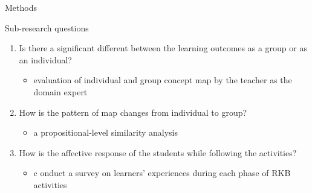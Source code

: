 \begin{frame}{Methods}
    \begin{block}{Sub-research questions}
        \begin{enumerate}
        \item <1-2> Is there a significant different between the learning outcomes as a group
        or as an individual?
        \begin{itemize}
            \item <2> evaluation of individual and group concept map by the teacher 
                  as the domain expert
        \end{itemize}
        
        \item <3-4> How is the pattern of map changes from individual to group?
        \begin{itemize}
            \item <4> a propositional-level similarity analysis
        \end{itemize}
        
        \item <5-6> How is the affective response of the students while following the activities?
        \begin{itemize}
            \item <6>c onduct a survey on learners' experiences during each phase of RKB activities
        \end{itemize}
        \end{enumerate}
    \end{block}
\end{frame}


